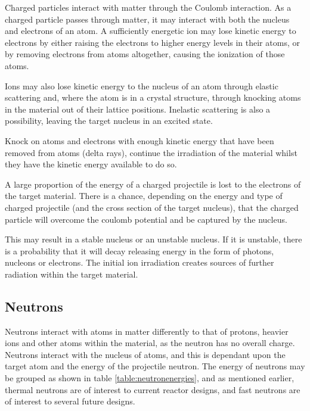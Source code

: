 Charged particles interact with matter through the Coulomb interaction.  As a charged particle passes through matter, it may interact with both the nucleus and electrons of an atom.  A sufficiently energetic ion may lose kinetic energy to electrons by either raising the electrons to higher energy levels in their atoms, or by removing electrons from atoms altogether, causing the ionization of those atoms.  

Ions may also lose kinetic energy to the nucleus of an atom through elastic scattering and, where the atom is in a crystal structure, through knocking atoms in the material out of their lattice positions.  Inelastic scattering is also a possibility, leaving the target nucleus in an excited state.

Knock on atoms and electrons with enough kinetic energy that have been removed from atoms (delta rays), continue the irradiation of the material whilst they have the kinetic energy available to do so.

A large proportion of the energy of a charged projectile is lost to the electrons of the target material.  There is a chance, depending on the energy and type of charged projectile (and the cross section of the target nucleus), that the charged particle will overcome the coulomb potential and be captured by the nucleus.

This may result in a stable nucleus or an unstable nucleus.  If it is unstable, there is a probability that it will decay releasing energy in the form of photons, nucleons or electrons.  The initial ion irradiation creates sources of further radiation within the target material.



\FloatBarrier
\subsection{Neutrons}


Neutrons interact with atoms in matter differently to that of protons, heavier ions and other atoms within the material, as the neutron has no overall charge.  Neutrons interact with the nucleus of atoms, and this is dependant upon the target atom and the energy of the projectile neutron.  The energy of neutrons may be grouped as shown in table \ref{table:neutronenergies}, and as mentioned earlier, thermal neutrons are of interest to current reactor designs, and fast neutrons are of interest to several future designs.
 
